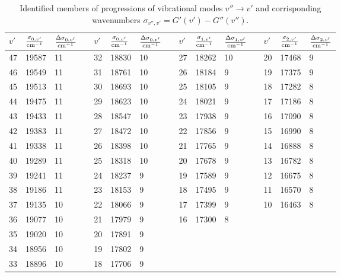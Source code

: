\begin{table}[h]
\centering
\footnotesize
\begin{tabular}{|l |l |l ||c|
                 l |l |l ||c|
                 l |l |l ||c|
                 l |l |l |}
\hline
$v'$ & $\frac{\sigma_{0,v'}}{\mathrm{cm^{-1}}}$ & $\frac{\Delta \sigma_{0,v'}}{\mathrm{cm^{-1}}}$ &&
$v'$ & $\frac{\sigma_{0,v'}}{\mathrm{cm^{-1}}}$ & $\frac{\Delta \sigma_{0,v'}}{\mathrm{cm^{-1}}}$ &&
$v'$ & $\frac{\sigma_{1,v'}}{\mathrm{cm^{-1}}}$ & $\frac{\Delta \sigma_{1,v'}}{\mathrm{cm^{-1}}}$ &&
$v'$ & $\frac{\sigma_{2,v'}}{\mathrm{cm^{-1}}}$ & $\frac{\Delta \sigma_{2,v'}}{\mathrm{cm^{-1}}}$ \\ \hline
47 & 19587 & 11 & &32 & 18830 & 10 & &27 & 18262 & 10 & &20 & 17468 & 9 \\ \hline
46 & 19549 & 11 & &31 & 18761 & 10 & &26 & 18184 & 9 & &19 & 17375 & 9 \\ \hline
45 & 19513 & 11 & &30 & 18693 & 10 & &25 & 18105 & 9 & &18 & 17282 & 8 \\ \hline
44 & 19475 & 11 & &29 & 18623 & 10 & &24 & 18021 & 9 & &17 & 17186 & 8 \\ \hline
43 & 19433 & 11 & &28 & 18547 & 10 & &23 & 17938 & 9 & &16 & 17090 & 8 \\ \hline
42 & 19383 & 11 & &27 & 18472 & 10 & &22 & 17856 & 9 & &15 & 16990 & 8 \\ \hline
41 & 19338 & 11 & &26 & 18398 & 10 & &21 & 17765 & 9 & &14 & 16888 & 8 \\ \hline
40 & 19289 & 11 & &25 & 18318 & 10 & &20 & 17678 & 9 & &13 & 16782 & 8 \\ \hline
39 & 19241 & 11 & &24 & 18237 & 9 & &19 & 17589 & 9 & &12 & 16675 & 8 \\ \hline
38 & 19186 & 11 & &23 & 18153 & 9 & &18 & 17495 & 9 & &11 & 16570 & 8 \\ \hline
37 & 19135 & 10 & &22 & 18066 & 9 & &17 & 17399 & 9 & &10 & 16463 & 8 \\ \hline
36 & 19077 & 10 & &21 & 17979 & 9 & &16 & 17300 & 8 \\ \cline{1-11}
35 & 19020 & 10 & &20 & 17891 & 9 \\ \cline{1-7}
34 & 18956 & 10 & &19 & 17802 & 9 \\ \cline{1-7}
33 & 18896 & 10 & &18 & 17706 & 9 \\ \cline{1-7}
\end{tabular}
\caption{Identified members of progressions of vibrational modes $v'' \rightarrow v'$ 
and corrisponding wavenumbers $\sigma_{v'', v'} = G'(v') - G''(v'').$}
\label{tab:prog}
\end{table}

